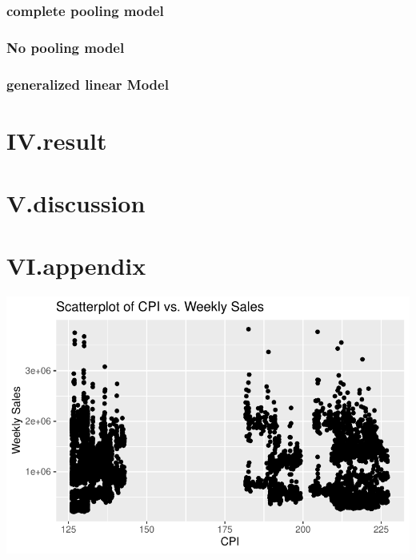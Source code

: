 \documentclass[
  letterpaper,
  DIV=11,
  numbers=noendperiod]{scrartcl}
\begin{document}
\hypertarget{complete-pooling-model}{%
\subsubsection{complete pooling model}\label{complete-pooling-model}}

\hypertarget{no-pooling-model}{%
\subsubsection{No pooling model}\label{no-pooling-model}}

\hypertarget{generalized-linear-model}{%
\subsubsection{generalized linear
Model}\label{generalized-linear-model}}

\hypertarget{iv.result}{%
\section{IV.result}\label{iv.result}}

\hypertarget{v.discussion}{%
\section{V.discussion}\label{v.discussion}}

\hypertarget{vi.appendix}{%
\section{VI.appendix}\label{vi.appendix}}

\includegraphics{678final_files/figure-pdf/unnamed-chunk-8-1.pdf}
\end{document}
